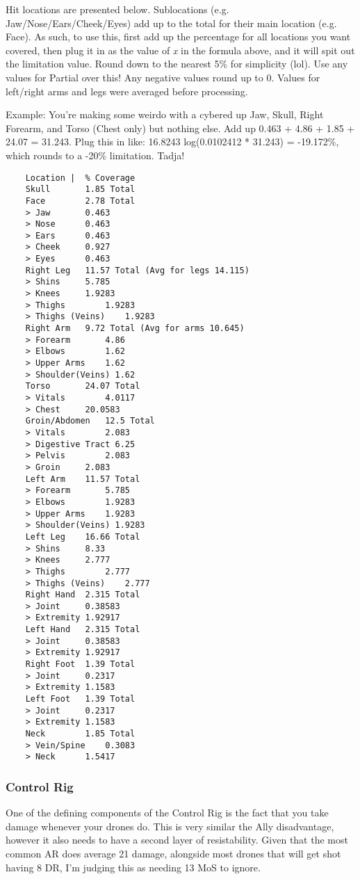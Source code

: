 \begin{multicols*}{2}
	Hit locations are presented below. Sublocations (e.g. Jaw/Nose/Ears/Cheek/Eyes) add up to the total for their main location (e.g. Face). As such, to use this, first add up the percentage for all locations you want covered, then plug it in as the value of \textit{x} in the formula above, and it will spit out the limitation value. Round down to the nearest 5\% for simplicity (lol). Use any values for Partial over this! Any negative values round up to 0. Values for left/right arms and legs were averaged before processing.
	
	Example: You're making some weirdo with a cybered up Jaw, Skull, Right Forearm, and Torso (Chest only) but nothing else. Add up 0.463 + 4.86 + 1.85 + 24.07 = 31.243. Plug this in like: 16.8243 log(0.0102412 * 31.243) = -19.172\%, which rounds to a -20\% limitation. Tadja!
	
	\begin{verbatim}
	Location |	% Coverage
	Skull		1.85 Total
	Face		2.78 Total
	> Jaw		0.463
	> Nose		0.463
	> Ears		0.463
	> Cheek		0.927
	> Eyes		0.463
	Right Leg	11.57 Total (Avg for legs 14.115)
	> Shins		5.785
	> Knees		1.9283
	> Thighs		1.9283
	> Thighs (Veins)	1.9283
	Right Arm	9.72 Total (Avg for arms 10.645)
	> Forearm		4.86
	> Elbows		1.62
	> Upper Arms	1.62
	> Shoulder(Veins) 1.62
	Torso		24.07 Total
	> Vitals		4.0117
	> Chest		20.0583
	Groin/Abdomen	12.5 Total
	> Vitals		2.083
	> Digestive Tract 6.25
	> Pelvis		2.083
	> Groin		2.083
	Left Arm	11.57 Total
	> Forearm		5.785
	> Elbows		1.9283
	> Upper Arms	1.9283
	> Shoulder(Veins) 1.9283
	Left Leg	16.66 Total
	> Shins		8.33
	> Knees		2.777
	> Thighs		2.777
	> Thighs (Veins)	2.777
	Right Hand	2.315 Total
	> Joint		0.38583
	> Extremity	1.92917
	Left Hand	2.315 Total
	> Joint		0.38583
	> Extremity	1.92917
	Right Foot	1.39 Total
	> Joint		0.2317
	> Extremity	1.1583
	Left Foot	1.39 Total
	> Joint		0.2317
	> Extremity	1.1583
	Neck		1.85 Total
	> Vein/Spine	0.3083
	> Neck		1.5417
	\end{verbatim}
	
	
	\subsubsection{Control Rig}\label{bts_riggers}
	
	One of the defining components of the Control Rig is the fact that you take damage whenever your drones do. This is very similar the Ally disadvantage, however it also needs to have a second layer of resistability. Given that the most common AR does average 21 damage, alongside most drones that will get shot having 8 DR, I'm judging this as needing 13 MoS to ignore.
	

\end{multicols*}
